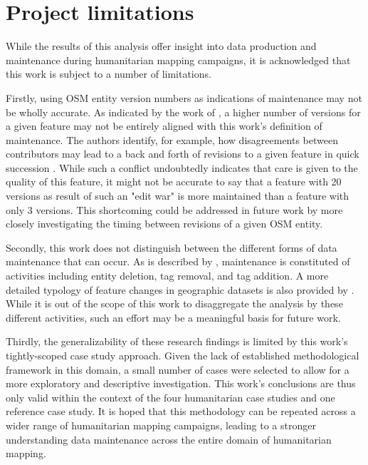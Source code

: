 \section{Project limitations}

While the results of this analysis offer insight into data production and maintenance during humanitarian mapping campaigns, it is acknowledged that this work is subject to a number of limitations. 

Firstly, using OSM entity version numbers as indications of maintenance may not be wholly accurate. As indicated by the work of \textcite{mooney_characteristics_2012}, a higher number of versions for a given feature may not be entirely aligned with this work's definition of maintenance. The authors identify, for example, how disagreements between contributors may lead to a back and forth of revisions to a given feature in quick succession \textcite{mooney_characteristics_2012}. While such a conflict undoubtedly indicates that care is given to the quality of this  feature, it might not be accurate to say that a feature with 20 versions as result of such an "edit war" is more maintained than a feature with only 3 versions. This shortcoming could be addressed in future work by more closely investigating the timing between revisions of a given OSM entity. 

Secondly, this work does not distinguish between the different forms of data maintenance that can occur. As is described by \textcite{quattrone_work_2017}, maintenance is constituted of activities including entity deletion, tag removal, and tag addition. A more detailed typology of feature changes in geographic datasets is also provided by \textcite{rehrl_towards_2015}. While it is out of the scope of this work to disaggregate the analysis by these different activities, such an effort may be a meaningful basis for future work.  

Thirdly, the generalizability of these research findings is limited by this work's tightly-scoped case study approach. Given the lack of established methodological framework in this domain, a small number of cases were selected to allow for a more exploratory and descriptive investigation. This work's conclusions are thus only valid within the context of the four humanitarian case studies and one reference case study. It is hoped that this methodology can be repeated across a wider range of humanitarian mapping campaigns, leading to a stronger understanding data maintenance across the entire domain of humanitarian mapping. 



